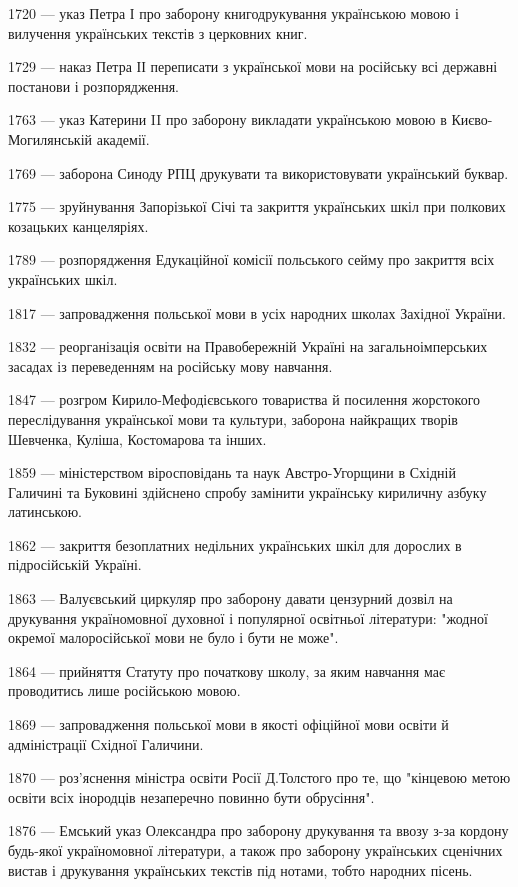 1720 — указ Петра І про заборону книгодрукування українською мовою і вилучення українських текстів з церковних книг.

1729 — наказ Петра ІІ переписати з української мови на російську всі державні постанови і розпорядження.

1763 — указ Катерини II про заборону викладати українською мовою в Києво-Могилянській академії.

1769 — заборона Синоду РПЦ друкувати та використовувати український буквар.

1775 — зруйнування Запорізької Січі та закриття українських шкіл при полкових козацьких канцеляріях.

1789 — розпорядження Едукаційної комісії польського сейму про закриття всіх українських шкіл.

1817 — запровадження польської мови в усіх народних школах Західної України.

1832 — реорганізація освіти на Правобережній Україні на загальноімперських засадах із переведенням на російську мову навчання.

1847 — розгром Кирило-Мефодієвського товариства й посилення жорстокого переслідування української мови та культури, заборона найкращих творів Шевченка, Куліша, Костомарова та інших.

1859 — міністерством віросповідань та наук Австро-Угорщини в Східній Галичині та Буковині здійснено спробу замінити українську кириличну азбуку латинською.

1862 — закриття безоплатних недільних українських шкіл для дорослих в підросійській Україні.

1863 — Валуєвський циркуляр про заборону давати цензурний дозвіл на друкування україномовної духовної і популярної освітньої літератури: "жодної окремої малоросійської мови не було і бути не може".

1864 — прийняття Статуту про початкову школу, за яким навчання має проводитись лише російською мовою.

1869 — запровадження польської мови в якості офіційної мови освіти й адміністрації Східної Галичини.

1870 — роз'яснення міністра освіти Росії Д.Толстого про те, що "кінцевою метою освіти всіх інородців незаперечно повинно бути обрусіння".

1876 — Емський указ Олександра про заборону друкування та ввозу з-за кордону будь-якої україномовної літератури, а також про заборону українських сценічних вистав і друкування українських текстів під нотами, тобто народних пісень.

